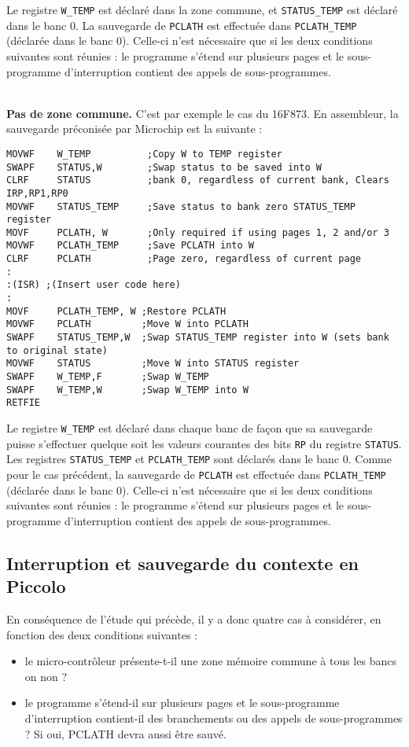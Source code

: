 Le registre \texttt{W\_TEMP} est déclaré dans la zone commune, et \texttt{STATUS\_TEMP} est déclaré dans le banc 0. La sauvegarde de \texttt{PCLATH} est effectuée dans \texttt{PCLATH\_TEMP} (déclarée dans le banc 0). Celle-ci n'est nécessaire que si les deux conditions suivantes sont réunies : le programme s’étend sur plusieurs pages et le sous-programme d’interruption contient des appels de sous-programmes.


~\\
\textbf{Pas de zone commune.} C’est par exemple le cas du 16F873. En assembleur, la sauvegarde préconisée par Microchip est la suivante :


\begin{lstlisting}[language=assembleur]
MOVWF    W_TEMP          ;Copy W to TEMP register 
SWAPF    STATUS,W        ;Swap status to be saved into W 
CLRF     STATUS          ;bank 0, regardless of current bank, Clears IRP,RP1,RP0 
MOVWF    STATUS_TEMP     ;Save status to bank zero STATUS_TEMP register 
MOVF     PCLATH, W       ;Only required if using pages 1, 2 and/or 3 
MOVWF    PCLATH_TEMP     ;Save PCLATH into W 
CLRF     PCLATH          ;Page zero, regardless of current page 
: 
:(ISR) ;(Insert user code here) 
: 
MOVF     PCLATH_TEMP, W ;Restore PCLATH 
MOVWF    PCLATH         ;Move W into PCLATH 
SWAPF    STATUS_TEMP,W  ;Swap STATUS_TEMP register into W (sets bank to original state) 
MOVWF    STATUS         ;Move W into STATUS register 
SWAPF    W_TEMP,F       ;Swap W_TEMP 
SWAPF    W_TEMP,W       ;Swap W_TEMP into W
RETFIE
\end{lstlisting}

Le registre \texttt{W\_TEMP} est déclaré dans chaque banc de façon que sa sauvegarde puisse s’effectuer quelque soit les valeurs courantes des bits \texttt{RP} du registre \texttt{STATUS}. Les registres \texttt{STATUS\_TEMP} et \texttt{PCLATH\_TEMP} sont déclarés dans le banc 0. Comme pour le cas précédent, la sauvegarde de \texttt{PCLATH} est effectuée dans \texttt{PCLATH\_TEMP} (déclarée dans le banc 0). Celle-ci n'est nécessaire que si les deux conditions suivantes sont réunies : le programme s’étend sur plusieurs pages et le sous-programme d’interruption contient des appels de sous-programmes.


\subsection{Interruption et sauvegarde du contexte en Piccolo}

En conséquence de l'étude qui précède, il y a donc quatre cas à considérer, en fonction des deux conditions suivantes :
\begin{itemize}
  \item le micro-contrôleur présente-t-il une zone mémoire commune à tous les bancs on non ?
  \item le programme s’étend-il sur plusieurs pages et le sous-programme d’interruption contient-il des branchements ou des appels de sous-programmes ? Si oui, PCLATH devra aussi être sauvé.
\end{itemize}



